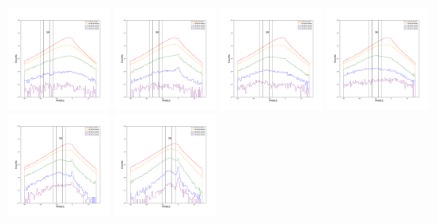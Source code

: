 \documentclass[12pt,prd]{article}
\begin{document}
\begin{figure}[h!]
\includegraphics[width=0.24\textwidth]{../figures/scanning_plotsgaiascan_l75_0_b66_4_ra216_0_dec41_0_npy_4.pdf}
\includegraphics[width=0.24\textwidth]{../figures/scanning_plotsgaiascan_l75_0_b66_4_ra216_0_dec41_0_npy_5.pdf}
\includegraphics[width=0.24\textwidth]{../figures/scanning_plotsgaiascan_l75_0_b66_4_ra216_0_dec41_0_npy_6.pdf}
\includegraphics[width=0.24\textwidth]{../figures/scanning_plotsgaiascan_l75_0_b66_4_ra216_0_dec41_0_npy_7.pdf}
\includegraphics[width=0.24\textwidth]{../figures/scanning_plotsgaiascan_l75_0_b66_4_ra216_0_dec41_0_npy_8.pdf}
\includegraphics[width=0.24\textwidth]{../figures/scanning_plotsgaiascan_l75_0_b66_4_ra216_0_dec41_0_npy_9.pdf}

\end{figure}
\end{document}
